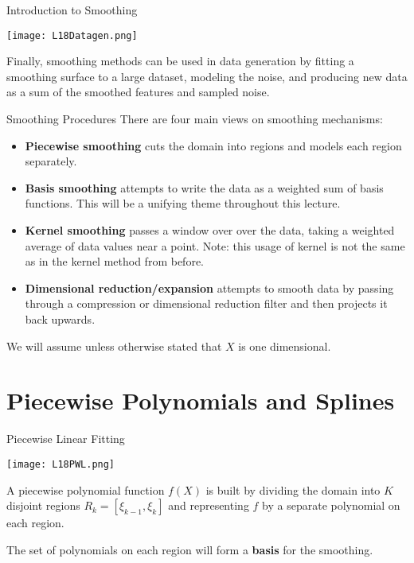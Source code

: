 \documentclass[10pt, table, dvipsnames,xcdraw,handout]{beamer}
\begin{document}
\begin{frame}[fragile]{Introduction to Smoothing}
  \begin{minipage}[t][0.5\textheight][t]{\textwidth}
	\centering \texttt{[image: L18Datagen.png]} 
  \end{minipage}
  \vfill
\begin{minipage}[t][0.5\textheight][t]{\textwidth}
Finally, smoothing methods can be used in data generation by fitting a smoothing surface to a large dataset, modeling the noise, and producing new data as a sum of the smoothed features and sampled noise. 
\end{minipage}
\end{frame}




\begin{frame}[fragile]{Smoothing Procedures}
There are four main views on smoothing mechanisms:
\begin{itemize}
\item[] \textbf{Piecewise smoothing} cuts the domain into regions and models each region separately. \pause
\item[] \textbf{Basis smoothing} attempts to write the data as a weighted sum of basis functions. This will be a unifying theme throughout this lecture. \pause
\item[] \textbf{Kernel smoothing} passes a window over over the data, taking a weighted average of data values near a point. Note: this usage of kernel is not the same as in the kernel method from before. \pause
\item[] \textbf{Dimensional reduction/expansion} attempts to smooth data by passing through a compression or dimensional reduction filter and then projects it back upwards.\pause
\end{itemize}


We will assume unless otherwise stated that $X$ is one dimensional. 
\end{frame}





\section{Piecewise Polynomials and Splines}



\begin{frame}[fragile]{Piecewise Linear Fitting}
  \begin{minipage}[t][0.5\textheight][t]{\textwidth}
	\centering \texttt{[image: L18PWL.png]} 
  \end{minipage}
  \vfill
\begin{minipage}[t][0.5\textheight][t]{\textwidth}
A piecewise polynomial function $f(X)$ is built by dividing the domain into $K$ disjoint regions $R_k = [\xi_{k-1},\xi_k]$ and representing $f$ by a separate polynomial on each region.  

The set of polynomials on each region will form a \textbf{basis} for the smoothing. 
\end{minipage}
\end{frame}
\end{document}
